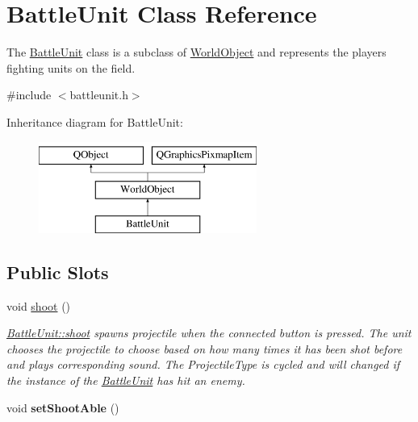 \hypertarget{class_battle_unit}{}\section{Battle\+Unit Class Reference}
\label{class_battle_unit}


The \hyperlink{class_battle_unit}{Battle\+Unit} class is a subclass of \hyperlink{class_world_object}{World\+Object} and represents the player\textquotesingle{}s fighting units on the field.  




{\ttfamily \#include $<$battleunit.\+h$>$}

Inheritance diagram for Battle\+Unit\+:\begin{figure}[H]
\begin{center}
\leavevmode
\includegraphics[height=3.000000cm]{class_battle_unit}
\end{center}
\end{figure}
\subsection*{Public Slots}
\begin{DoxyCompactItemize}
\item 
void \hyperlink{class_battle_unit_ad483aca2f0e52cb79c5b0444f6fbd1da}{shoot} ()\hypertarget{class_battle_unit_ad483aca2f0e52cb79c5b0444f6fbd1da}{}\label{class_battle_unit_ad483aca2f0e52cb79c5b0444f6fbd1da}

\begin{DoxyCompactList}\small\item\em \hyperlink{class_battle_unit_ad483aca2f0e52cb79c5b0444f6fbd1da}{Battle\+Unit\+::shoot} spawns projectile when the connected button is pressed. The unit chooses the projectile to choose based on how many times it has been shot before and plays corresponding sound. The Projectile\+Type is cycled and will changed if the instance of the \hyperlink{class_battle_unit}{Battle\+Unit} has hit an enemy. \end{DoxyCompactList}\item 
void {\bfseries set\+Shoot\+Able} ()\hypertarget{class_battle_unit_a32aaaf8056f9545f231a9bdc368aef8f}{}\label{class_battle_unit_a32aaaf8056f9545f231a9bdc368aef8f}

\end{DoxyCompactItemize}
